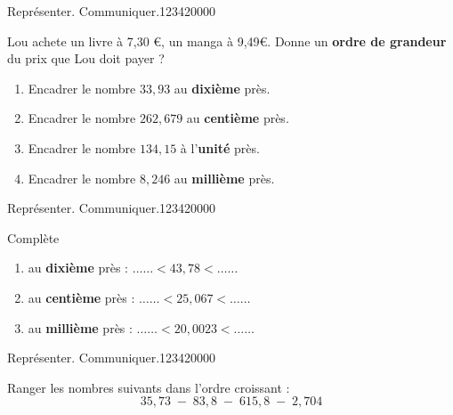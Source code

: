 \begin{pageAD} 


 
\begin{ExoCad}{Représenter. Communiquer.}{1234}{2}{0}{0}{0}{0}

Lou  achete un livre à 7,30 \euro , un manga à 9,49\euro . Donne un \textbf{ordre de grandeur} du prix que Lou doit payer ?
 



\begin{enumerate}
\item Encadrer le nombre $33,93$ au \textbf{dixième} près.
 \item Encadrer le nombre $262,679$ au \textbf{centième} près.
\item Encadrer le nombre $134,15$ à l'\textbf{unité} près.
\item Encadrer le nombre $8,246$ au \textbf{millième} près.
\end{enumerate}
\end{ExoCad}


\begin{ExoCad}{Représenter. Communiquer.}{1234}{2}{0}{0}{0}{0}


Complète 
\begin{enumerate}
\item au \textbf{dixième} près : $\ldots \ldots < 43,78 < \ldots \ldots $
\item au \textbf{centième} près : $\ldots \ldots < 25,067 < \ldots \ldots $
\item au \textbf{millième} près : $\ldots \ldots < 20,0023 < \ldots \ldots $
\end{enumerate}

\end{ExoCad}

\begin{ExoCad}{Représenter. Communiquer.}{1234}{2}{0}{0}{0}{0}

Ranger les nombres suivants dans l'ordre croissant : \[35,73\;-\;83,8\;-\;615,8\;-\;2,704\]

\end{ExoCad}

\end{pageAD} 



